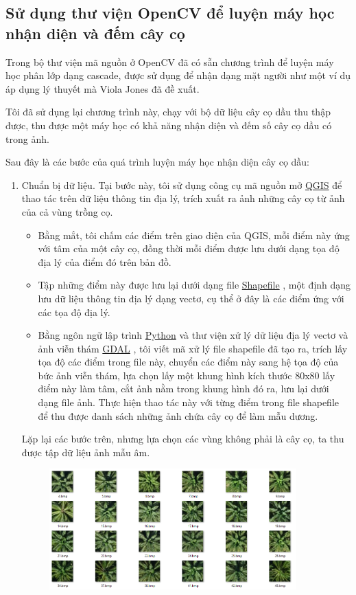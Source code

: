 \documentclass[14pt, oneside, a4paper, openany]{scrartcl}
\begin{document}
\subsection{Sử dụng thư viện OpenCV để luyện máy học nhận diện và đếm cây cọ}
Trong bộ thư viện mã nguồn ở OpenCV đã có sẵn chương trình để luyện máy học phân lớp dạng cascade, được sử dụng để nhận dạng mặt người như một ví dụ áp dụng lý thuyết mà Viola Jones đã đề xuất.

Tôi đã sử dụng lại chương trình này, chạy với bộ dữ liệu cây cọ dầu thu thập được, thu được một máy học có khả năng nhận diện và đếm số cây cọ dầu có trong ảnh.

Sau đây là các bước của quá trình luyện máy học nhận diện cây cọ dầu:
\begin{enumerate}
	\item Chuẩn bị dữ liệu. Tại bước này, tôi sử dụng công cụ mã nguồn mở \href{http://www.qgis.org/en/site/}{QGIS} \cite{qgis} để thao tác trên dữ liệu thông tin địa lý, trích xuất ra ảnh những cây cọ từ ảnh của cả vùng trồng cọ.
	\begin{itemize}
		\item Bằng mắt, tôi chấm các điểm trên giao diện của QGIS, mỗi điểm này ứng với tâm của một cây cọ, đồng thời mỗi điểm được lưu dưới dạng tọa độ địa lý của điểm đó trên bản đồ.
		\item Tập những điểm này được lưu lại dưới dạng file \href{http://doc.arcgis.com/en/arcgis-online/reference/shapefiles.htm}{Shapefile} \cite{Shapefiles}, một định dạng lưu dữ liệu thông tin địa lý dạng vectơ, cụ thể ở đây là các điểm ứng với các tọa độ địa lý.
		\item Bằng ngôn ngữ lập trình \href{https://www.python.org/}{Python} \cite{python} và thư viện xử lý dữ liệu địa lý vectơ và ảnh viễn thám \href{http://gdal.org/}{GDAL} \cite{gdal}, tôi viết mã xử lý file shapefile đã tạo ra, trích lấy tọa độ các điểm trong file này, chuyển các điểm này sang hệ tọa độ của bức ảnh viễn thám, lựa chọn lấy một khung hình kích thước 80x80 lấy điểm này làm tâm, cắt ảnh nằm trong khung hình đó ra, lưu lại dưới dạng file ảnh. Thực hiện thao tác này với từng điểm trong file shapefile để thu được danh sách những ảnh chứa cây cọ để làm mẫu dương.
	\end{itemize}
	Lặp lại các bước trên, nhưng lựa chọn các vùng không phải là cây cọ, ta thu được tập dữ liệu ảnh mẫu âm.
	\begin{figure}[!h]
		\centering
		\begin{minipage}{0.7\textwidth}
			\centering
			\includegraphics[width=0.9\textwidth]{figures/positiveList.png} %

\end{minipage}
\end{figure}
\end{enumerate}
\end{document}
